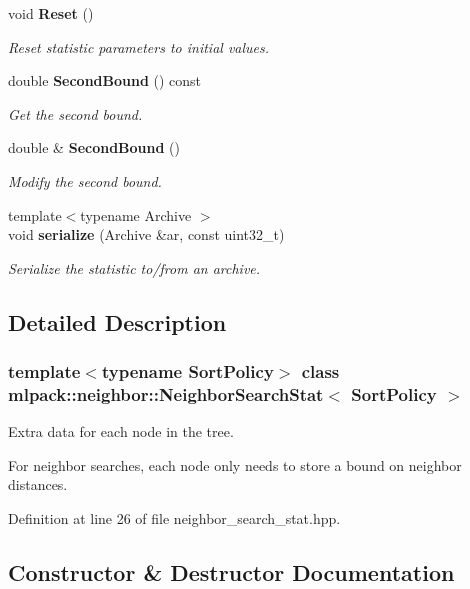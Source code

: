 \begin{DoxyCompactItemize}
void \textbf{ Reset} ()
\begin{DoxyCompactList}\small\item\em Reset statistic parameters to initial values. \end{DoxyCompactList}\item 
double \textbf{ Second\+Bound} () const
\begin{DoxyCompactList}\small\item\em Get the second bound. \end{DoxyCompactList}\item 
double \& \textbf{ Second\+Bound} ()
\begin{DoxyCompactList}\small\item\em Modify the second bound. \end{DoxyCompactList}\item 
{\footnotesize template$<$typename Archive $>$ }\\void \textbf{ serialize} (Archive \&ar, const uint32\+\_\+t)
\begin{DoxyCompactList}\small\item\em Serialize the statistic to/from an archive. \end{DoxyCompactList}\end{DoxyCompactItemize}


\subsection{Detailed Description}
\subsubsection*{template$<$typename Sort\+Policy$>$\newline
class mlpack\+::neighbor\+::\+Neighbor\+Search\+Stat$<$ Sort\+Policy $>$}

Extra data for each node in the tree. 

For neighbor searches, each node only needs to store a bound on neighbor distances. 

Definition at line 26 of file neighbor\+\_\+search\+\_\+stat.\+hpp.



\subsection{Constructor \& Destructor Documentation}
\mbox{\label{classmlpack_1_1neighbor_1_1NeighborSearchStat_ae911ff9386cbf7f4b2f80b49baf65587}} 
